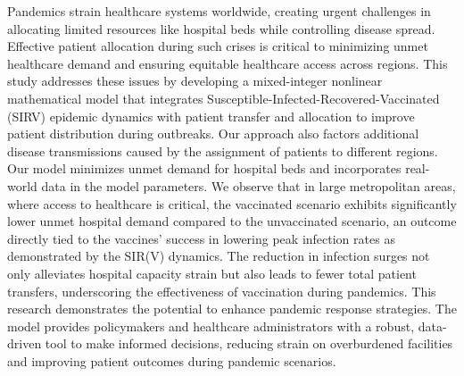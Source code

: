 \documentclass{article}
\begin{document}
  \fontsize{10}{12}\selectfont




  \begin{ieomabstract}
      Pandemics strain healthcare systems worldwide, creating urgent challenges in allocating limited resources like hospital beds while controlling disease spread. Effective patient allocation during such crises is critical to minimizing unmet healthcare demand and ensuring equitable healthcare access across regions. This study addresses these issues by developing a mixed-integer nonlinear mathematical model that integrates Susceptible-Infected-Recovered-Vaccinated (SIRV) epidemic dynamics with patient transfer and allocation to improve patient distribution during outbreaks. Our approach also factors additional disease transmissions caused by the assignment of patients to different regions. Our model minimizes unmet demand for hospital beds and incorporates real-world data in the model parameters. We observe that in large metropolitan areas, where access to healthcare is critical, the vaccinated scenario exhibits significantly lower unmet hospital demand compared to the unvaccinated scenario, an outcome directly tied to the vaccines' success in lowering peak infection rates as demonstrated by the SIR(V) dynamics. The reduction in infection surges not only alleviates hospital capacity strain but also leads to fewer total patient transfers, underscoring the effectiveness of vaccination during pandemics. This research demonstrates the potential to enhance pandemic response strategies. The model provides policymakers and healthcare administrators with a robust, data-driven tool to make informed decisions, reducing strain on overburdened facilities and improving patient outcomes during pandemic scenarios.
  \end{ieomabstract}
\end{document}
